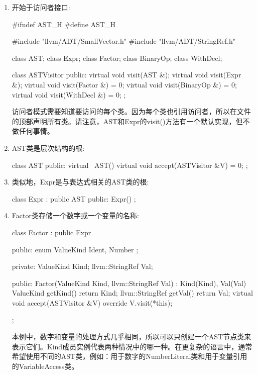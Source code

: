 \begin{enumerate}
\item
开始于访问者接口:

\begin{cpp}
#ifndef AST_H
#define AST_H

#include "llvm/ADT/SmallVector.h"
#include "llvm/ADT/StringRef.h"

class AST;
class Expr;
class Factor;
class BinaryOp;
class WithDecl;

class ASTVisitor {
    public:
    virtual void visit(AST &){};
    virtual void visit(Expr &){};
    virtual void visit(Factor &) = 0;
    virtual void visit(BinaryOp &) = 0;
    virtual void visit(WithDecl &) = 0;
};
\end{cpp}

访问者模式需要知道要访问的每个类。因为每个类也引用访问者，所以在文件的顶部声明所有类。请注意，AST和Expr的visit()方法有一个默认实现，但不做任何事情。

\item
AST类是层次结构的根:

\begin{cpp}
class AST {
public:
    virtual ~AST() {}
    virtual void accept(ASTVisitor &V) = 0;
};
\end{cpp}

\item
类似地，Expr是与表达式相关的AST类的根:

\begin{cpp}
class Expr : public AST {
public:
    Expr() {}
};
\end{cpp}

\item
Factor类存储一个数字或一个变量的名称:

\begin{cpp}
class Factor : public Expr {
public:
    enum ValueKind { Ident, Number };

private:
    ValueKind Kind;
    llvm::StringRef Val;

public:
    Factor(ValueKind Kind, llvm::StringRef Val)
        : Kind(Kind), Val(Val) {}
    ValueKind getKind() { return Kind; }
    llvm::StringRef getVal() { return Val; }
    virtual void accept(ASTVisitor &V) override {
        V.visit(*this);
    }
};
\end{cpp}

本例中，数字和变量的处理方式几乎相同，所以可以只创建一个AST节点类来表示它们。Kind成员实例代表两种情况中的哪一种。在更复杂的语言中，通常希望使用不同的AST类，例如：用于数字的NumberLiteral类和用于变量引用的VariableAccess类。


\end{enumerate}
